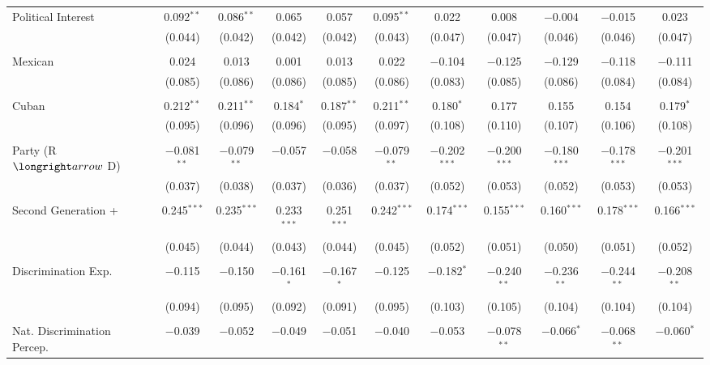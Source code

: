 \begin{table}[!htbp]
\begin{tabular}{@{\extracolsep{5pt}}lcccccccccc}
 Political Interest & 0.092$^{**}$ & 0.086$^{**}$ & 0.065 & 0.057 & 0.095$^{**}$ & 0.022 & 0.008 & $-$0.004 & $-$0.015 & 0.023 \\ 
  & (0.044) & (0.042) & (0.042) & (0.042) & (0.043) & (0.047) & (0.047) & (0.046) & (0.046) & (0.047) \\ 
  & & & & & & & & & & \\ 
 Mexican & 0.024 & 0.013 & 0.001 & 0.013 & 0.022 & $-$0.104 & $-$0.125 & $-$0.129 & $-$0.118 & $-$0.111 \\ 
  & (0.085) & (0.086) & (0.086) & (0.085) & (0.086) & (0.083) & (0.085) & (0.086) & (0.084) & (0.084) \\ 
  & & & & & & & & & & \\ 
 Cuban & 0.212$^{**}$ & 0.211$^{**}$ & 0.184$^{*}$ & 0.187$^{**}$ & 0.211$^{**}$ & 0.180$^{*}$ & 0.177 & 0.155 & 0.154 & 0.179$^{*}$ \\ 
  & (0.095) & (0.096) & (0.096) & (0.095) & (0.097) & (0.108) & (0.110) & (0.107) & (0.106) & (0.108) \\ 
  & & & & & & & & & & \\ 
 Party (R $\longright arrow$ D) & $-$0.081$^{**}$ & $-$0.079$^{**}$ & $-$0.057 & $-$0.058 & $-$0.079$^{**}$ & $-$0.202$^{***}$ & $-$0.200$^{***}$ & $-$0.180$^{***}$ & $-$0.178$^{***}$ & $-$0.201$^{***}$ \\ 
  & (0.037) & (0.038) & (0.037) & (0.036) & (0.037) & (0.052) & (0.053) & (0.052) & (0.053) & (0.053) \\ 
  & & & & & & & & & & \\ 
 Second Generation + & 0.245$^{***}$ & 0.235$^{***}$ & 0.233$^{***}$ & 0.251$^{***}$ & 0.242$^{***}$ & 0.174$^{***}$ & 0.155$^{***}$ & 0.160$^{***}$ & 0.178$^{***}$ & 0.166$^{***}$ \\ 
  & (0.045) & (0.044) & (0.043) & (0.044) & (0.045) & (0.052) & (0.051) & (0.050) & (0.051) & (0.052) \\ 
  & & & & & & & & & & \\ 
 Discrimination Exp. & $-$0.115 & $-$0.150 & $-$0.161$^{*}$ & $-$0.167$^{*}$ & $-$0.125 & $-$0.182$^{*}$ & $-$0.240$^{**}$ & $-$0.236$^{**}$ & $-$0.244$^{**}$ & $-$0.208$^{**}$ \\ 
  & (0.094) & (0.095) & (0.092) & (0.091) & (0.095) & (0.103) & (0.105) & (0.104) & (0.104) & (0.104) \\ 
  & & & & & & & & & & \\ 
 Nat. Discrimination Percep. & $-$0.039 & $-$0.052 & $-$0.049 & $-$0.051 & $-$0.040 & $-$0.053 & $-$0.078$^{**}$ & $-$0.066$^{*}$ & $-$0.068$^{**}$ & $-$0.060$^{*}$ \\ 

\end{tabular}
\end{table}
